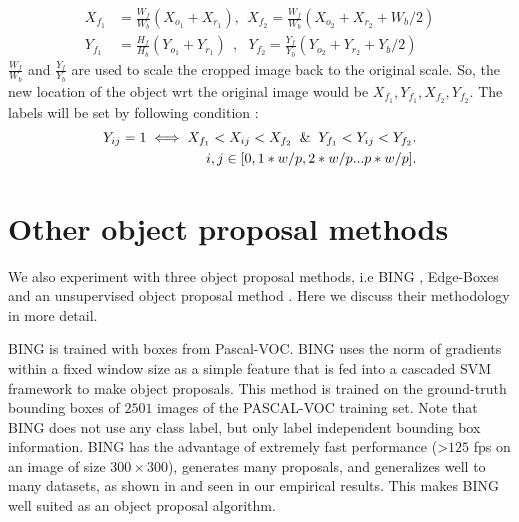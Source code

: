 \begin{align}
X_{f_1} &= \frac{W_f}{W_b} (X_{o_1} + X_{r_1}), ~~
X_{f_2} = \frac{W_f}{W_b} (X_{o_2} + X_{r_2} + W_b/2 )  \\
Y_{f_1} &= \frac{H_f}{H_b}(Y_{o_1} + Y_{r_1})~~, ~~~  
Y_{f_2} = \frac{Y_f}{Y_b}(Y_{o_2} + Y_{r_2} + Y_b/2 ) 
\end{align}
$\frac{W_f}{W_b}$ and $\frac{Y_f}{Y_b}$ are used to scale the cropped image back to the original scale.
So, the new location of the object wrt the original image would be  $X_{f_1}, Y_{f_1}, X_{f_2}, Y_{f_2}$.
The labels will be set by following condition :
\begin{align}
Y_{ij} = 1  \iff  X_{f_1} < X_{ij} < X_{f_2} \And  Y_{f_1} < Y_{ij} < Y_{f_2} . \\
i,j \in [ {0, 1 * w/p, 2* w/p ... p *w /p} ] . 
\end{align}


\section{Other object proposal methods}
\label{sec:object_proposal_methods}
We also experiment with three object proposal methods, i.e BING \cite{Cheng2014BINGBN}, Edge-Boxes \citep{Zitnick2014EdgeBL} and an unsupervised object proposal method \citep{vo2019unsupervised}. Here we discuss their methodology in more detail.

BING is trained with boxes from Pascal-VOC.
BING \cite{Cheng2014BINGBN} uses the norm of gradients within a fixed window size as a simple feature that is fed into a cascaded SVM framework to make object proposals. This method is trained on the ground-truth bounding boxes of $2501$ images of the PASCAL-VOC \cite{everingham2010pascal} training set. Note that BING does not use any class label, but only label independent bounding box information. BING has the advantage of extremely fast performance (>$125$ fps on an image of size $300 \times 300$), generates many proposals, and generalizes well to many datasets, as shown in \cite{Cheng2014BINGBN} and seen in our empirical results. This makes BING well suited as an object proposal algorithm.


